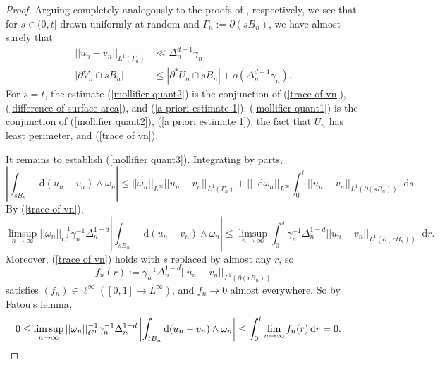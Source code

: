 \documentclass[reqno,10pt]{amsart}
\newcommand*\dif{\mathop{}\!\mathrm{d}}
\theoremstyle{definition}
\numberwithin{equation}{section}
\begin{document}
\begin{proof}
Arguing completely analogously to the proofs of \cite[(7.23), (7.22)]{Giusti77}, respectively, we see that
for $s \in (0, t]$ drawn uniformly at random and $\Gamma_n := \partial(sB_n)$, we have almost surely that
\begin{align}
||u_n - v_n||_{L^1(\Gamma_n)} &\ll \Delta_n^{d - 1} \gamma_n \label{trace of vn} \\
|\partial V_n \cap sB_n| &\leq |\partial^* U_n \cap sB_n| + o(\Delta_n^{d - 1} \gamma_n). \label{difference of surface area}
\end{align}
For $s = t$, the estimate (\ref{mollifier quant2}) is the conjunction of (\ref{trace of vn}), (\ref{difference of surface area}), and (\ref{a priori estimate 1});
(\ref{mollifier quant1}) is the conjunction of (\ref{mollifier quant2}), (\ref{a priori estimate 1}), the fact that $U_n$ has least perimeter, and (\ref{trace of vn}).

It remains to establish (\ref{mollifier quant3}).
Integrating by parts,
$$\left|\int_{sB_n} \dif (u_n - v_n) \wedge \omega_n\right| \leq ||\omega_n||_{L^\infty} ||u_n - v_n||_{L^1(\Gamma_n)} + ||\dif \omega_n||_{L^\infty} \int_0^t ||u_n - v_n||_{L^1(\partial(sB_n))} \dif s.$$
By (\ref{trace of vn}),
$$\limsup_{n \to \infty} ||\omega_n||_{C^1}^{-1} \gamma_n^{-1} \Delta_n^{1 - d} \left|\int_{sB_n} \dif(u_n - v_n) \wedge \omega_n\right| \leq \limsup_{n \to \infty} \int_0^s \gamma_n^{-1} \Delta_n^{1 - d} ||u_n - v_n||_{L^1(\partial(rB_n))} \dif r.$$
Moreover, (\ref{trace of vn}) holds with $s$ replaced by almost any $r$, so
$$f_n(r) := \gamma_n^{-1} \Delta_n^{1 - d} ||u_n - v_n||_{L^1(\partial(rB_n))}$$
satisfies $(f_n) \in \ell^\infty([0, 1] \to L^\infty)$, and $f_n \to 0$ almost everywhere.
So by Fatou's lemma,
\begin{align*}
0 \leq \limsup_{n \to \infty} ||\omega_n||_{C^1}^{-1} \gamma_n^{-1} \Delta_n^{1 - d} \left|\int_{tB_n} \dif(u_n - v_n) \wedge \omega_n\right| &\leq \int_0^t \lim_{n \to \infty} f_n(r) \dif r = 0. \qedhere
\end{align*}
\end{proof}
\end{document}
